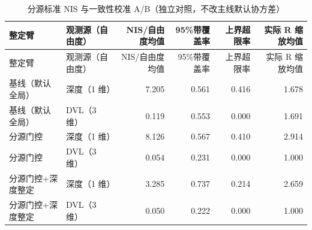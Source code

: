 \begin{longtable}[]{@{}llrrrr@{}}
\caption{分源标准 NIS 与一致性校准 A/B（独立对照，不改主线默认协方差）}\label{tab:ch05-nis-covariance-ab}\tabularnewline
\toprule\noalign{}
整定臂 & 观测源（自由度） & NIS/自由度均值 & 95\%带覆盖率 & 上界超限率 & 实际 R 缩放均值 \\
\midrule\noalign{}
\endfirsthead
\toprule\noalign{}
整定臂 & 观测源（自由度） & NIS/自由度均值 & 95\%带覆盖率 & 上界超限率 & 实际 R 缩放均值 \\
\midrule\noalign{}
\endhead
\bottomrule\noalign{}
\endlastfoot
基线（默认全局） & 深度（1 维） & 7.205 & 0.561 & 0.416 & 1.678 \\
基线（默认全局） & DVL（3 维） & 0.119 & 0.553 & 0.000 & 1.691 \\
分源门控 & 深度（1 维） & 8.126 & 0.567 & 0.410 & 2.914 \\
分源门控 & DVL（3 维） & 0.054 & 0.231 & 0.000 & 1.000 \\
分源门控+深度整定 & 深度（1 维） & 3.285 & 0.737 & 0.214 & 2.659 \\
分源门控+深度整定 & DVL（3 维） & 0.050 & 0.222 & 0.000 & 1.000 \\
\end{longtable}
